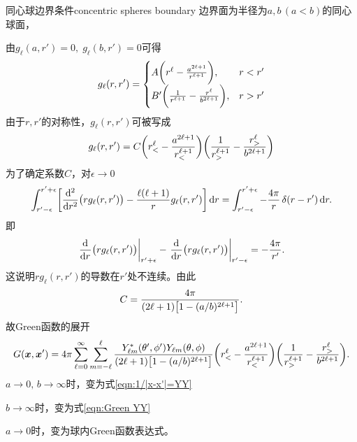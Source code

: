 \begin{example}{同心球边界条件}{concentric spheres boundary}
    边界面为半径为$a,b\,(a<b)$的同心球面，
    \begin{center}
    \end{center}
    由$g_\ell(a,r')=0,\;g_\ell(b,r')=0$可得
    \[
        g_\ell(r,r')=
        \begin{cases}
            A\biggkh{r^\ell-\frac{a^{2\ell+1}}{r^{\ell+1}}},&r<r'\\
            B'\biggkh{\frac1{r^{\ell+1}}-\frac{r^\ell}{b^{2\ell+1}}},&r>r'\\
        \end{cases}
    \]
    由于$r,r'$的对称性，$g_\ell(r,r')$可被写成 
    \[
        g_\ell(r,r')=C\biggkh{r_<^\ell-\frac{a^{2\ell+1}}{r_<^{\ell+1}}}\biggkh{\frac1{r_>^{\ell+1}}-\frac{r_>^\ell}{b^{2\ell+1}}}
    \]
    为了确定系数$C$，对$\epsilon\to0$
    \[
        \int_{r'-\epsilon}^{r'+\epsilon}\biggfkh{\dd[2]r\bigkh{rg_\ell(r,r')}-\frac{\ell(\ell+1)}{r}g_\ell(r,r')}\d r=\int_{r'-\epsilon}^{r'+\epsilon}-\frac{4\pi}r\vd(r-r')\d r.
    \]
    即
    \[
        \edg{\dd r\bigkh{rg_\ell(r,r')}}_{r'+\epsilon}-\edg{\dd r\bigkh{rg_\ell(r,r')}}_{r'-\epsilon}=-\frac{4\pi}{r'}.
    \]
    这说明$rg_\ell(r,r')$的导数在$r'$处不连续。由此
    \[
        C=\frac{4\pi}{(2\ell+1)\bigfkh{1-(a/b)^{2\ell+1}}}.
    \]
    故Green函数的展开
    \begin{equation}
        G(\bm x,\bm x')=4\pi\sum_{\ell=0}^\infty\sum_{m=-\ell}^\ell \frac{Y_{\ell m}^\ast(\theta',\phi')Y_{\ell m}(\theta,\phi)}{(2\ell+1)\bigfkh{1-(a/b)^{2\ell+1}}}\biggkh{r_<^\ell-\frac{a^{2\ell+1}}{r_<^{\ell+1}}}\biggkh{\frac1{r_>^{\ell+1}}-\frac{r_>^\ell}{b^{2\ell+1}}}.
    \end{equation}
    \tcblower
    $a\to0,\,b\to\infty$时，变为式\eqref{eqn:1/|x-x'|=YY}

    $b\to\infty$时，变为式\eqref{eqn:Green YY}

    $a\to0$时，变为球内Green函数表达式。
\end{example}

